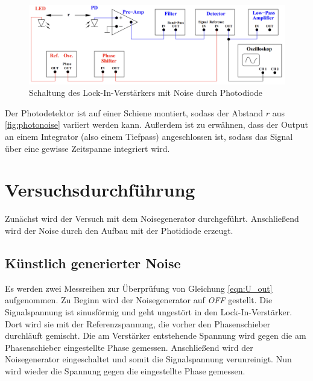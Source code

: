 \begin{figure}[H]
    \includegraphics[width=\textwidth]{./content/Schaltung_Photodiode.png}
    \caption{Schaltung des Lock-In-Verstärkers mit Noise durch Photodiode \cite{Versuchsanleitung_v303}}
    \label{fig:photonoise}
\end{figure}

\noindent
Der Photodetektor ist auf einer Schiene montiert, sodass der Abstand $r$ aus \autoref{fig:photonoise} variiert werden kann.
Außerdem ist zu erwähnen, dass der Output an einem Integrator (also einem Tiefpass) angeschlossen ist, sodass das Signal über eine 
gewisse Zeitspanne integriert wird.


\section{Versuchsdurchführung}
Zunächst wird der Versuch mit dem Noisegenerator durchgeführt. Anschließend wird der Noise durch den Aufbau mit der Photidiode erzeugt.

\subsection{Künstlich generierter Noise}
\label{sec:durchf_kunst}
Es werden zwei Messreihen zur Überprüfung von Gleichung \eqref{eqn:U_out} aufgenommen. Zu Beginn wird der Noisegenerator auf \emph{OFF} gestellt.
Die Signalspannung ist sinusförmig und geht ungestört in den Lock-In-Verstärker. Dort wird sie mit der Referenzspannung, die vorher den 
Phasenschieber durchläuft gemischt. Die am Verstärker entstehende Spannung wird gegen die am Phasenschieber eingestellte Phase gemessen.
Anschließend wird der Noisegenerator eingeschaltet und somit die Signalspannung verunreinigt. Nun wird wieder die Spannung gegen die eingestellte 
Phase gemessen.

